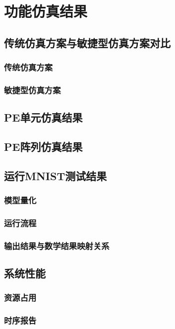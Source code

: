 \chapter{功能仿真结果}

\section{传统仿真方案与敏捷型仿真方案对比}
    \subsection{传统仿真方案}
    \subsection{敏捷型仿真方案}

\section{PE单元仿真结果}

\section{PE阵列仿真结果}

\section{运行MNIST测试结果}
    \subsection{模型量化}
    \subsection{运行流程}
    \subsection{输出结果与数学结果映射关系}

\section{系统性能}
    \subsection{资源占用}
    \subsection{时序报告}


